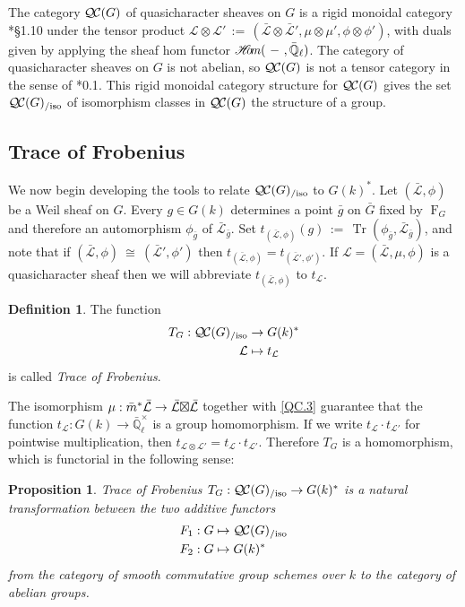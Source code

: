 \documentclass{amsart}
\theoremstyle{plain}
\newtheorem{proposition}[theorem]{Proposition}
\theoremstyle{definition}
\newtheorem{definition}[theorem]{Definition}
\theoremstyle{remark}
\newcommand{\EE}{\mathbb{\bar Q}_\ell}
\newcommand{\Fq}{k}
\newcommand{\EEx}{\EE^\times}
\newcommand{\Frob}[1]{\operatorname{F}_{#1}}
\DeclareMathOperator{\trace}{Tr}
\newcommand{\sheafHom}{{\mathscr{H}\hskip-4pt{\it o}\hskip-2pt{\it m}}}
\newcommand{\ceq}{{\, :=\, }}
\newcommand{\iso}{{\ \cong\ }}
\newcommand{\qcs}[1]{{\mathcal{#1}}}
\newcommand{\gqcs}[1]{{\mathcal{\bar #1}}}
\newcommand{\QC}{{\mathcal{Q\hskip-0.8pt C}}}
\newcommand{\QCiso}[1]{\QC(#1)_{/\text{iso}}}
\newcommand{\trFrob}[1]{t_{#1}}
\newcommand{\TrFrob}[1]{T_{#1}}
\newcommand{\bg}{\bar{g}}
\newcommand{\bm}{\bar{m}}
\newcommand{\bG}{\bar{G}}
\newcommand{\tight}[3]{\hspace{-#1pt}{#2}\hspace{-#3pt}}
\newcommand{\LxL}{\text{$\gqcs{L} \tight{0}{\boxtimes}{0} \gqcs{L}$}}
\begin{document}
The category $\QC(G)$ of quasicharacter sheaves on $G$ is a rigid monoidal category
\cite{etingof:09a}*{\S1.10} under the tensor product
$\qcs{L} \otimes \qcs{L'} \ceq (\gqcs{L}\otimes\gqcs{L'}, \mu\otimes\mu', \phi\otimes \phi')$,
with duals given by applying the sheaf hom functor
$\sheafHom(\ - \ ,\EE)$.
The category of quasicharacter sheaves on $G$ is not abelian, so $\QC(G)$
is not a tensor category in the sense of \cite{deligne:02a}*{0.1}.
This rigid monoidal category structure for $\QC(G)$ gives the set $\QCiso{G}$
of isomorphism classes in $\QC(G)$ the structure of a group.

\subsection{Trace of Frobenius}\label{sec:Frob}

We now begin developing the tools to relate $\QCiso{G}$ to $G(\Fq)^*$.
%
Let $(\gqcs{L},\phi)$ be a Weil sheaf on $G$. Every $g\in G(\Fq)$
determines a point $\bg$ on $\bG$ fixed by $\Frob{G}$ and
therefore an automorphism $\phi_{\bg}$ of $\gqcs{L}_{\bg}$. Set $\trFrob{(\gqcs{L},\phi)}(g) \ceq \trace(\phi_{\bg}, \gqcs{L}_{\bg})$,
and note that if $(\gqcs{L},\phi) \iso (\gqcs{L'},\phi')$ then $\trFrob{(\gqcs{L},\phi)} = \trFrob{(\gqcs{L'},\phi')}$.
 If $\qcs{L} = (\gqcs{L},\mu,\phi)$ is a quasicharacter sheaf
then we will abbreviate $\trFrob{(\gqcs{L},\phi)}$ to $\trFrob{\qcs{L}}$.

\begin{definition}\label{def:trFrob}
The function
\begin{align*}
\TrFrob{G}: \QCiso{G} &\to G(\Fq)^* \\
\qcs{L} &\mapsto t_{\qcs{L}}
\end{align*}
is called \emph{Trace of Frobenius}.
\end{definition}

The isomorphism $\mu : \bm^* \gqcs{L} \to \LxL$ together with
\ref{QC.3} guarantee
that the function $\trFrob{\qcs{L}} : G(\Fq)\to \EEx$ is a group homomorphism.  If we write
$\trFrob{\qcs{L}} \cdot \trFrob{\qcs{L'}}$ for pointwise multiplication, then
 $\trFrob{\qcs{L}\otimes \qcs{L'}} = \trFrob{\qcs{L}} \cdot \trFrob{\qcs{L'}}$.
 Therefore $\TrFrob{G}$ is a homomorphism, which is functorial in the following sense:

\begin{proposition}\label{prop:functorialG}
Trace of Frobenius $\TrFrob{G} : \QCiso{G} \to G(\Fq)^*$ is a natural transformation
between the two additive functors
\begin{align*}
F_1 : G &\mapsto \QCiso{G} \\
F_2 : G &\mapsto G(\Fq)^*
\end{align*}
from the category of smooth commutative group schemes over $\Fq$ to the category of abelian groups.
\end{proposition}
\end{document}
